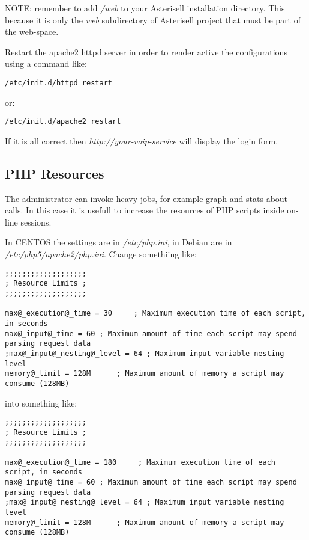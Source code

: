 \documentclass[letterpaper,10pt,english]{sphinxmanual}
\begin{document}
NOTE: remember to add \emph{/web} to your Asterisell installation directory. This because it is only the \emph{web} subdirectory of Asterisell project that must be part of the web-space.

Restart the apache2 httpd server in order to render active the configurations using a command like:

\begin{Verbatim}[commandchars=@\[\]]
/etc/init.d/httpd restart
\end{Verbatim}

or:

\begin{Verbatim}[commandchars=@\[\]]
/etc/init.d/apache2 restart
\end{Verbatim}

If it is all correct then \emph{http://your-voip-service} will display the login form.


\subsection{PHP Resources}
\label{index:php-resources}
The administrator can invoke heavy jobs, for example graph and stats about calls. In this case it is usefull to increase the resources of PHP scripts inside on-line sessions.

In CENTOS the settings are in \emph{/etc/php.ini}, in Debian are in \emph{/etc/php5/apache2/php.ini}. Change somethiing like:

\begin{Verbatim}[commandchars=@\[\]]
;;;;;;;;;;;;;;;;;;;
; Resource Limits ;
;;;;;;;;;;;;;;;;;;;

max@_execution@_time = 30     ; Maximum execution time of each script, in seconds
max@_input@_time = 60 ; Maximum amount of time each script may spend parsing request data
;max@_input@_nesting@_level = 64 ; Maximum input variable nesting level
memory@_limit = 128M      ; Maximum amount of memory a script may consume (128MB)
\end{Verbatim}

into something like:

\begin{Verbatim}[commandchars=@\[\]]
;;;;;;;;;;;;;;;;;;;
; Resource Limits ;
;;;;;;;;;;;;;;;;;;;

max@_execution@_time = 180     ; Maximum execution time of each script, in seconds
max@_input@_time = 60 ; Maximum amount of time each script may spend parsing request data
;max@_input@_nesting@_level = 64 ; Maximum input variable nesting level
memory@_limit = 128M      ; Maximum amount of memory a script may consume (128MB)
\end{Verbatim}
\end{document}
